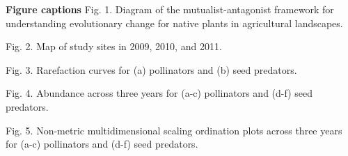 \documentclass[12pt]{article}
\begin{document}
\newpage 

 

\newpage 
\textbf{Figure captions}
Fig. 1.  Diagram of the mutualist-antagonist framework for understanding evolutionary change for native plants in agricultural landscapes.  

Fig. 2.  Map of study sites in 2009, 2010, and 2011.  

Fig. 3.  Rarefaction curves for (a) pollinators and (b) seed predators. 

Fig. 4.  Abundance across three years for (a-c) pollinators and (d-f) seed predators. 

Fig. 5.  Non-metric multidimensional scaling ordination plots across three years for (a-c) pollinators and (d-f) seed predators. 
\end{document}
